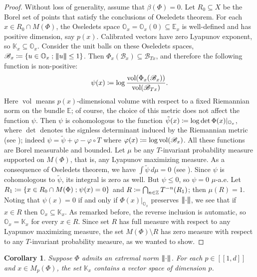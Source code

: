 \documentclass[JEP,XML,SOM,Unicode]{cedram}
\let\mathcal\mathscr
\newcommand{\ldbrack}{[\![}
\newcommand{\rdbrack}{]\!]}
\def\vcentcolon{\mathrel{\mathop\ordinarycolon}}
\providecommand\ordinarycolon{:}
\providecommand*\coloneqq{\vcentcolon\mathrel{\mkern-1.2mu}=}
\theoremstyle{plain}
\newtheorem{corollary}[theorem]{Corollary}
\theoremstyle{definition}
\newcommand{\tribar}[1]{\mathopen{| {\kern -1.5pt} | {\kern -1.5pt} |} {#1}
\mathclose{| {\kern -1.5pt} | {\kern -1.5pt} |}}
\newcommand{\ZZ}{\mathbb{Z}}
\newcommand{\EE}{\mathbb{E}}
\newcommand{\KK}{\mathbb{K}}
\newcommand{\cB}{\mathcal{B}}
\newcommand{\st}{\;\mathord{;}\;}
\DeclareMathOperator{\vol}{vol}
\let\phi\varphi
\begin{document}
\begin{proof}
Without loss of generality, assume that $\beta(\Phi)=0$.
Let $R_0 \subseteq X$ be the Borel set of points that satisfy the conclusions of Oseledets theorem.
For each $x \in R_0 \cap M(\Phi)$, the Oseledets space $\mathbb{O}_x = \mathbb{O}_x(0) \subseteq \EE_x$ is well-defined and has positive dimension, say $p(x)$.
Calibrated vectors have zero Lyapunov exponent, so $\KK_x \subseteq \mathbb{O}_x$.
Consider the unit balls on these Oseledets spaces, \ie $\cB_x \coloneqq \{ u \in \mathbb{O}_x \st \tribar{u} \le 1\}$.
Then $\Phi_x(\cB_{x}) \subseteq \cB_{Tx}$, and therefore the following function is non-positive:
\[
\psi(x) \coloneqq \log \frac{\vol(\Phi_x(\cB_{x}))}{\vol(\cB_{Tx})}.
\]
Here $\vol$ means $p(x)$-dimensional volume with respect to a fixed Riemannian norm on the bundle $\EE$; of course, the choice of this metric does not affect the function $\psi$.
Then $\psi$ is cohomologous to the function
$\tilde \psi(x) \coloneqq \log \det \Phi(x)|_{\mathbb{O}_x}$, where $\det$ denotes the signless determinant induced by the Riemannian metric (see \cite[p.\,213]{Arnold}); indeed $\psi = \tilde \psi + \phi - \phi\circ T$ where $\phi(x) \coloneqq \log \vol(\cB_{x})$.
All these functions are Borel measurable and bounded.
Let $\mu$ be any $T$-invariant probability measure supported on $M(\Phi)$, that is, any Lyapunov maximizing measure.
As a consequence of Oseledets theorem, we have $\int \tilde\psi \, d\mu = 0$ (see \cite[p.\,214]{Arnold}). Since $\psi$ is cohomologous to $\tilde \psi$, its integral is zero as well. But $\psi \le 0$, so $\psi = 0$ $\mu$-a.e.
Let $R_1 \coloneqq \{ x \in R_0 \cap M(\Phi) \st \psi(x)=0 \}$ and $R \coloneqq \bigcap_{n \in \ZZ} T^{-n}(R_1)$; then $\mu (R) = 1$.
Noting that $\psi(x) = 0$ if and only if $\Phi(x)|_{\mathbb{O}_x}$ preserves $\tribar{\mathord{\cdot}}$, we see that if $x \in R$ then $\mathbb{O}_x \subseteq \KK_x$.
As remarked before, the reverse inclusion is automatic, so $\mathbb{O}_x = \KK_x$ for every $x \in R$.
Since set $R$ has full measure with respect to any Lyapunov maximizing measure, the set $M(\Phi) \setminus R$ has zero measure with respect to any $T$-invariant probability measure, as we wanted to show.
\end{proof}

\begin{corollary}\label{c.dimension}
Suppose $\Phi$ admits an extremal norm $ \tribar{\cdot}$.
For each $p \in \ldbrack 1, d \rdbrack$ and $x \in M_p(\Phi)$, the set $\KK_x$ contains a vector space of dimension $p$.
\end{corollary}
\end{document}
